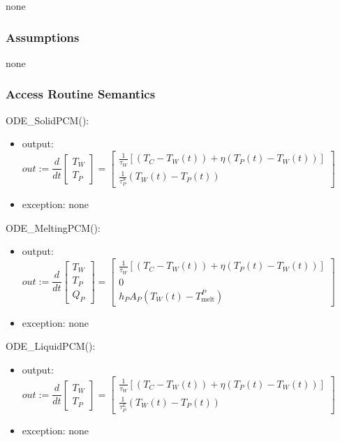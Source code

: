 \documentclass[12pt, titlepage]{article}
\begin{document}
none

\subsubsection{Assumptions}

none

\subsubsection{Access Routine Semantics}

ODE\_SolidPCM(): 
\renewcommand*{\arraystretch}{1.5}
\begin{itemize}
\item output: $out := 
\dfrac{d}{dt} \left [ 
\begin{array}{c}
T_W\\
T_P 
\end{array} 
\right] =
\left [ 
\begin{array}{c}
\frac{1}{\tau_W}[(T_C - T_W(t)) + {\eta}(T_P(t) - T_W(t))]\\
\frac{1}{\tau^S_P}(T_W(t) - T_P(t)) 
\end{array} 
\right]
$
\item exception: none
\end{itemize}

ODE\_MeltingPCM(): 
\renewcommand*{\arraystretch}{1.5}
\begin{itemize}
\item output: $out := 
\dfrac{d}{dt} \left [ 
\begin{array}{c}
T_W\\
T_P\\
Q_P 
\end{array} 
\right] =
\left [ 
\begin{array}{c}
\frac{1}{\tau_W}[(T_C - T_W(t)) + {\eta}(T_P(t) - T_W(t))]\\
0 \\
h_P A_P (T_W(t) - T_\text{melt}^P)
\end{array} 
\right]
$
\item exception: none
\end{itemize}

ODE\_LiquidPCM(): 
\renewcommand*{\arraystretch}{1.5}
\begin{itemize}
\item output: $out := 
\dfrac{d}{dt} \left [ 
\begin{array}{c}
T_W\\
T_P
\end{array} 
\right] =
\left [ 
\begin{array}{c}
\frac{1}{\tau_W}[(T_C - T_W(t)) + {\eta}(T_P(t) - T_W(t))]\\
\frac{1}{\tau^L_P}(T_W(t) - T_P(t))
\end{array} 
\right]
$
\item exception: none
\end{itemize}
\end{document}
